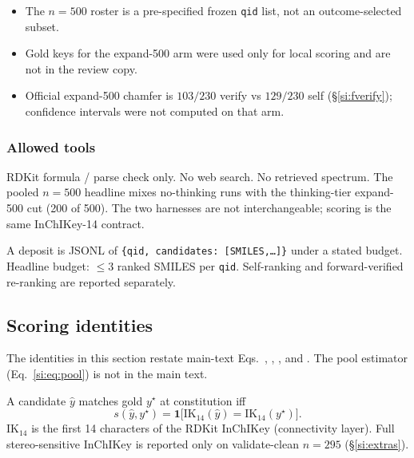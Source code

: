 \begin{itemize}
  \item The $n{=}500$ roster is a pre-specified frozen \texttt{qid} list,
        not an outcome-selected subset.
  \item Gold keys for the expand-500 arm were used only for local scoring
        and are not in the review copy.
  \item Official expand-500 chamfer is $103/230$ verify vs $129/230$ self
        (\S\ref{si:fverify}); confidence intervals were not computed on
        that arm.
\end{itemize}

\subsubsection{Allowed tools}

RDKit formula / parse check only. No web search. No retrieved spectrum.
The pooled $n{=}500$ headline mixes no-thinking runs with the thinking-tier
expand-500 cut (200 of 500).
The two harnesses are not interchangeable; scoring is the same InChIKey-14 contract.

A deposit is JSONL of \texttt{\{qid, candidates: [SMILES,\ldots]\}} under a
stated budget. Headline budget: $\leq 3$ ranked SMILES per \texttt{qid}.
Self-ranking and forward-verified re-ranking are reported separately.

\subsection{Scoring identities}
\label{si:eqs}

The identities in this section restate main-text Eqs.~, , , and .
The pool estimator (Eq.~\ref{si:eq:pool}) is not in the main text.

A candidate $\hat y$ matches gold $y^\star$ at constitution iff
\begin{equation}
\label{si:eq:ik14}
s(\hat y, y^\star)
=\mathbf{1}\big[\mathrm{IK}_{14}(\hat y)=\mathrm{IK}_{14}(y^\star)\big].
\end{equation}
$\mathrm{IK}_{14}$ is the first 14 characters of the RDKit InChIKey
(connectivity layer). Full stereo-sensitive InChIKey is reported only on
validate-clean $n{=}295$ (\S\ref{si:extras}).

